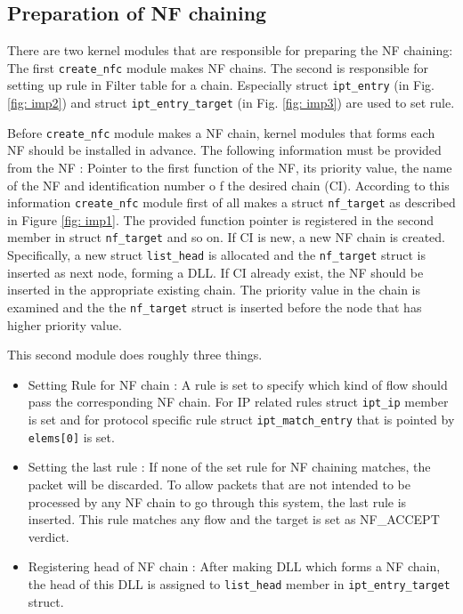 \subsection{Preparation of NF chaining} 
There are two kernel modules that are responsible for preparing the NF chaining: The first {\tt create\_nfc} module makes NF chains. The second is responsible for setting up rule in Filter table for a chain. Especially struct {\tt ipt\_entry} (in Fig. \ref{fig: imp2}) and struct {\tt ipt\_entry\_target} (in Fig. \ref{fig: imp3}) are used to set rule. 

Before {\tt create\_nfc} module makes a NF chain, kernel modules that forms each NF should be installed in advance. The following information must be provided from the NF : Pointer to the first function of the NF, its priority value, the name of the NF and identification number o f the desired chain (CI). According to this information {\tt create\_nfc} module first of all makes a struct {\tt nf\_target} as described in Figure \ref{fig: imp1}. The provided function pointer is registered in the second member in struct {\tt nf\_target} and so on. If CI is new, a new NF chain is created. Specifically, a new struct {\tt list\_head} is allocated and the {\tt nf\_target} struct is inserted as next node, forming a DLL. If CI already exist, the NF should be inserted in the appropriate existing chain. The priority value in the chain is examined and the the {\tt nf\_target} struct is inserted before the node that has higher priority value.

This second module does roughly three things. 
\begin{itemize}
	\item Setting Rule for NF chain : A rule is set to specify which kind of flow should pass the corresponding NF chain. For IP related rules struct {\tt ipt\_ip} member is set and for protocol specific rule struct {\tt ipt\_match\_entry} that is pointed by {\tt elems[0]} is set. 
	\item Setting the last rule : If none of the set rule for NF chaining matches, the packet will be discarded. To allow packets that are not intended to be processed by any NF chain to go through this system, the last rule is inserted. This rule matches any flow and the target is set as NF\_ACCEPT verdict. 
	\item Registering head of NF chain : After making DLL which forms a NF chain, the head of this DLL is assigned to {\tt list\_head} member in {\tt ipt\_entry\_target} struct. 
\end{itemize}

